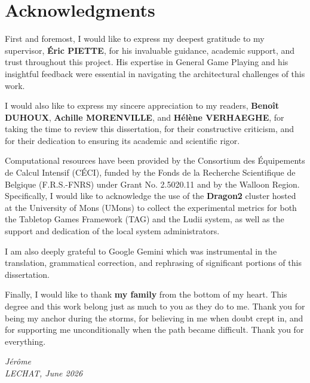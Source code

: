 \chapter*{Acknowledgments}

First and foremost, I would like to express my deepest gratitude to my supervisor, \textbf{Éric PIETTE}, for his invaluable guidance, academic support, and trust throughout this project. His expertise in General Game Playing and his insightful feedback were essential in navigating the architectural challenges of this work.

\vspace{0.5cm}

I would also like to express my sincere appreciation to my readers, \textbf{Benoît DUHOUX}, \textbf{Achille MORENVILLE}, and \textbf{Hélène VERHAEGHE}, for taking the time to review this dissertation, for their constructive criticism, and for their dedication to ensuring its academic and scientific rigor.

\vspace{0.5cm}

Computational resources have been provided by the Consortium des Équipements de Calcul Intensif (CÉCI), funded by the Fonds de la Recherche Scientifique de Belgique (F.R.S.-FNRS) under Grant No. 2.5020.11 and by the Walloon Region. Specifically, I would like to acknowledge the use of the \textbf{Dragon2} cluster hosted at the University of Mons (UMons) to collect the experimental metrics for both the Tabletop Games Framework (TAG) and the Ludii system, as well as the support and dedication of the local system administrators.

\vspace{0.5cm}

I am also deeply grateful to Google Gemini which was instrumental in the translation, grammatical correction, and rephrasing of significant portions of this dissertation.

\vspace{0.5cm}

Finally, I would like to thank \textbf{my family} from the bottom of my heart. This degree and this work belong just as much to you as they do to me. Thank you for being my anchor during the storms, for believing in me when doubt crept in, and for supporting me unconditionally when the path became difficult. Thank you for everything.

\begin{flushright}
{\makeatletter\itshape
    Jérôme \\
    LECHAT, June 2026
\makeatother}
\end{flushright}